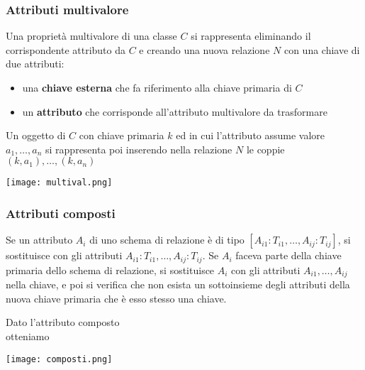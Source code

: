 \newpage
\subsubsection{Attributi multivalore}
Una proprietà multivalore di una classe $C$ si rappresenta eliminando il corrispondente attributo da $C$ e creando una nuova relazione $N$ con una chiave di due attributi:
\begin{itemize}
	\item una \textbf{chiave esterna} che fa riferimento alla chiave primaria di $C$
	\item un \textbf{attributo} che corrisponde all’attributo multivalore da trasformare
\end{itemize}
Un oggetto di $C$ con chiave primaria $k$ ed in cui l’attributo assume valore $a_1, \ldots, a_n$ si rappresenta poi inserendo nella relazione $N$ le coppie $(k, a_1), \ldots , (k, a_n)$

\begin{center}
	\texttt{[image: multival.png]}
\end{center}

\subsubsection{Attributi composti}
Se un attributo $A_i$ di uno schema di relazione è di tipo $[A_{i1} : T_{i1}, \ldots , A_{ij} :
T_{ij}]$, si sostituisce con gli attributi $A_{i1} : T_{i1}, \ldots, A_{ij} : T_{ij}$. Se $A_i$ faceva parte della chiave primaria dello schema di relazione, si sostituisce $A_i$ con gli attributi $A_{i1}, \ldots, A_{ij}$ nella chiave, e poi si verifica che non esista un sottoinsieme degli attributi della nuova chiave primaria che è esso stesso una chiave.

\begin{example}
	Dato l'attributo composto
	\begin{equation*}
		[\text{Via} : \text{string}, \text{Numero} : \text{int}, \text{Citta}:\text{string}]
	\end{equation*}
	otteniamo
	\begin{center}
		\texttt{[image: composti.png]}
	\end{center}
\end{example}